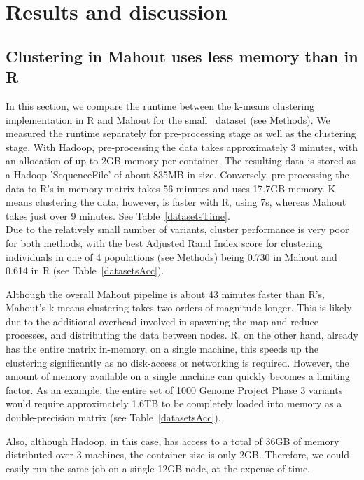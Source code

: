 \documentclass{bioinfo}
\begin{document}


\section*{Results and discussion}


\subsection*{Clustering in Mahout uses less memory than in R}
In this section, we compare the runtime between the k-means clustering implementation in R and Mahout for the small \NinteenPhaseone\ dataset (see Methods). 
We measured the runtime separately for pre-processing stage as well as the clustering stage. 
With Hadoop, pre-processing the data takes approximately 3 minutes, with an allocation of up to 2GB memory per container. The resulting data is stored as a Hadoop 'SequenceFile' of about 835MB in size.
Conversely,  pre-processing the data to R's in-memory matrix takes 56 minutes and uses 17.7GB memory. 
K-means clustering the data, however, is faster with R, using 7s, whereas Mahout takes just over 9 minutes. See Table~\ref{datasetsTime}. \\
Due to the relatively small number of variants, cluster performance is very poor for both methods, with the best Adjusted Rand Index score for clustering individuals in one of 4 populations (see Methods) being 0.730 in Mahout and 0.614 in R (see Table~\ref{datasetsAcc}).

Although the overall Mahout pipeline is about 43 minutes faster than R's, Mahout's k-means clustering takes two orders of magnitude longer. 
This is likely due to the additional overhead involved in spawning the map and reduce processes, and distributing the data between nodes.
R, on the other hand, already has the entire matrix in-memory, on a single machine, this speeds up the clustering significantly as no disk-access or networking is required. However, the amount of memory available on a single machine can quickly becomes a limiting factor. As an example, the entire set of 1000 Genome Project Phase 3 variants would require approximately 1.6TB to be completely loaded into memory as a double-precision matrix (see Table~\ref{datasetsAcc}). 

Also, although Hadoop, in this case, has access to a total of 36GB of memory distributed over 3 machines, the container size is only 2GB. Therefore, we could
easily run the same job on a single 12GB node, at the expense of time. 
\end{document}
